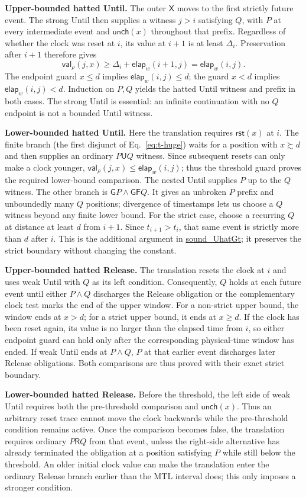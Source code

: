 \documentclass{ieeeaccess}
\newcommand{\Until}{\mathbin{\mathsf{U}}}
\newcommand{\Release}{\mathbin{\mathsf{R}}}
\newcommand{\Next}{\mathsf{X}}
\newcommand{\Always}{\mathsf{G}}
\newcommand{\Eventually}{\mathsf{F}}
\newcommand{\Reset}{\mathsf{rst}}
\newcommand{\Unch}{\mathsf{unch}}
\newcommand{\CVal}{\mathsf{val}}
\newcommand{\elapsed}{\mathsf{elap}}
\newcommand{\runinhead}[1]{\par\noindent\textbf{#1}\enspace}
\newcommand{\Rocqid}[1]{\url{#1}}
\begin{document}
\runinhead{Upper-bounded hatted Until.}
The outer $\Next$ moves to the first strictly future event. The strong Until
then supplies a witness $j>i$ satisfying $Q$, with $P$ at every intermediate
event and $\Unch(x)$ throughout that prefix. Regardless of whether the clock
was reset at $i$, its value at $i+1$ is at least $\Delta_i$.
Preservation after $i+1$ therefore gives
\[
\CVal_\rho(j,x)\ge
\Delta_i+\elapsed_w(i+1,j)=\elapsed_w(i,j).
\]
The endpoint guard $x\le d$ implies $\elapsed_w(i,j)\le d$; the guard $x<d$
implies $\elapsed_w(i,j)<d$. Induction on $P,Q$ yields the hatted Until
witness and prefix in both cases. The strong Until is essential: an infinite
continuation with no $Q$ endpoint is not a bounded Until witness.

\runinhead{Lower-bounded hatted Until.}
Here the translation requires $\Reset(x)$ at $i$. The finite branch (the first disjunct of
Eq.~\eqref{eq:t-huge}) waits for a position with $x\succsim d$ and then supplies an
ordinary $P\Until Q$ witness. Since subsequent resets can only make a clock
younger, $\CVal_\rho(j,x)\le\elapsed_w(i,j)$; thus the threshold guard proves
the required lower-bound comparison. The nested Until supplies $P$ up to the
$Q$ witness. The other branch is
$\Always P\land\Always\Eventually Q$. It gives an unbroken $P$ prefix and
unboundedly many $Q$ positions; divergence of timestamps lets us choose a
$Q$ witness beyond any finite lower bound. For the strict case, choose a
recurring $Q$ at distance at least $d$ from $i+1$. Since
$t_{i+1}>t_i$, that same event is strictly more than $d$ after $i$. This is
the additional argument in \Rocqid{sound_UhatGt}; it preserves the strict
boundary without changing the constant.

\runinhead{Upper-bounded hatted Release.}
The translation resets the clock at $i$ and uses weak Until with $Q$ as its
left condition. Consequently, $Q$ holds at each future event until either
$P\land Q$ discharges the Release obligation or the complementary clock test
marks the end of the upper window. For a non-strict upper bound, the window
ends at $x>d$; for a strict upper bound, it ends at $x\ge d$. If the clock
has been reset again, its value is no larger than the elapsed time from $i$,
so either endpoint guard can hold only after the corresponding physical-time
window has ended. If weak Until ends at $P\land Q$, $P$ at that earlier event
discharges later Release obligations. Both comparisons are thus proved with
their exact strict boundary.

\runinhead{Lower-bounded hatted Release.}
Before the threshold, the left side of weak Until requires both the
pre-threshold comparison and $\Unch(x)$. Thus an arbitrary reset trace
cannot move the clock backwards while the pre-threshold condition remains
active. Once the comparison becomes false, the translation requires ordinary
$P\Release Q$ from that event, unless the right-side alternative has already
terminated the obligation at a position satisfying $P$ while still below the
threshold. An older initial clock value can make the translation enter the
ordinary Release branch earlier than the MTL interval does; this only imposes
a stronger condition. 
\end{document}
